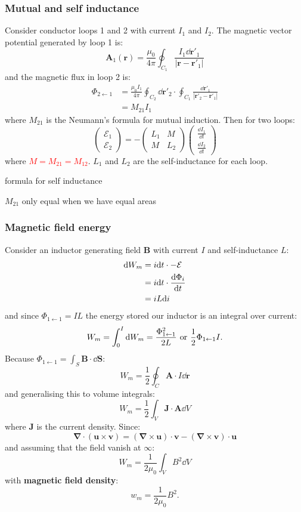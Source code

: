 \documentclass{article}
\newcommand{\vc}[1]{\boldsymbol{#1}}
\begin{document}
\begin{multicols*}{3}
\subsubsection*{Mutual and self inductance}
Consider conductor loops 1 and 2 with
current $I_1$ and $I_2$.
The magnetic vector potential generated by loop 1 is:
$$\vc{A}_1(\vc{r})=\frac{\mu_0}{4\pi}\oint_{C_1}
\frac{I_1\dd\vc{r}'_1}{|\vc{r}-\vc{r}'_1|}$$
and the magnetic flux in loop 2 is:
\begin{align*}
    \Phi_{2\leftarrow1}
    &=\frac{\mu_0 I_1}{4\pi}\oint_{C_2}\dd\vc{r}'_2
    \cdot\oint_{C_1}\frac{\dd\vc{r}'_1}{|\vc{r}'_2-\vc{r}'_1|} \\
    &=M_{21}I_1
\end{align*}
where $M_{21}$ is the Neumann's formula for mutual induction.
Then for two loops:
$$\begin{pmatrix}\mathcal{E}_1 \\ \mathcal{E}_2\end{pmatrix}=
-\begin{pmatrix}L_1 & M \\ M & L_2\end{pmatrix}
\begin{pmatrix}\frac{\dd I_1}{\dd t}
\\[0.2em] \frac{\dd I_2}{\dd t}\end{pmatrix}$$
where \textcolor{red}{$M=M_{21}=M_{12}$}.
$L_1$ and $L_2$ are the self-inductance for each loop.

formula for self inductance

$M_{21}$ only equal when we have equal areas

\subsubsection*{Magnetic field energy}
Consider an inductor generating field $\vc{B}$
with current $I$ and self-inductance $L$:
\begin{align*}
    \dd W_m
    &=i\dd t\cdot -\mathcal{E} \\
    &=i\dd t\cdot\dv{\Phi_i}{t} \\
    &=iL\dd i
\end{align*}
and since $\Phi_{1\leftarrow1}=IL$
the energy stored our inductor is an integral over current:
$$W_m=\int_{0}^{I}\dd W_m=\frac{\Phi_{1\leftarrow1}^2}{2L}
\hspace{0.05in}\text{or}\hspace{0.05in}
\frac{1}{2}\Phi_{1\leftarrow1} I.$$
Because
$\displaystyle\Phi_{1\leftarrow1}=\int_S\vc{B}\cdot\dd\vc{S}$:
$$W_m=\frac{1}{2}\oint_C\vc{A}\cdot I\dd\vc{r}$$
and generalising this to volume integrals:
$$W_m=\frac{1}{2}\int_V\vc{J}\cdot\vc{A}\dd V$$
where $\vc{J}$ is the current density. Since:
$$\vc{\nabla}\cdot(\vc{u}\times\vc{v})
=(\vc{\nabla}\times\vc{u})\cdot\vc{v}
-(\vc{\nabla}\times\vc{v})\cdot\vc{u}$$
and assuming that the field vanish at $\infty$:
$$W_m=\frac{1}{2\mu_0}\int_V B^2\dd V$$
with \textbf{magnetic field density}:
$$w_m=\frac{1}{2\mu_0}B^2.$$


\end{multicols*}
\end{document}
